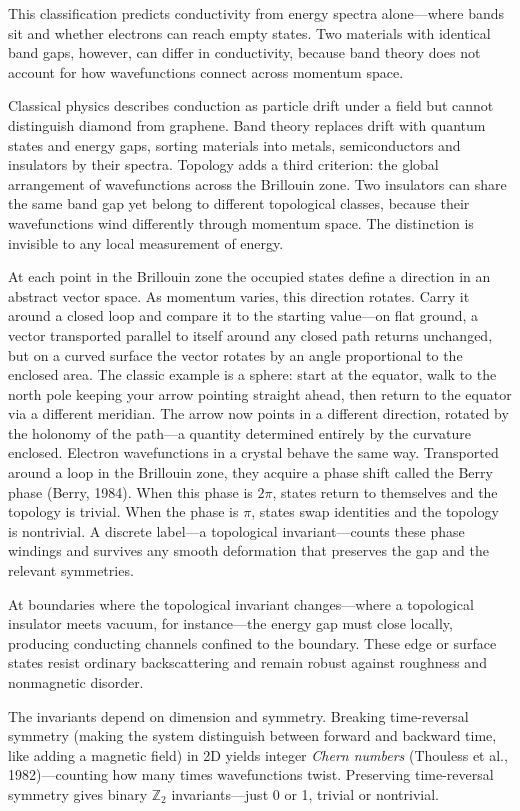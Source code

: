 This classification predicts conductivity from energy spectra alone—where bands sit and whether electrons can reach empty states. Two materials with identical band gaps, however, can differ in conductivity, because band theory does not account for how wavefunctions connect across momentum space.

Classical physics describes conduction as particle drift under a field but cannot distinguish diamond from graphene. Band theory replaces drift with quantum states and energy gaps, sorting materials into metals, semiconductors and insulators by their spectra. Topology adds a third criterion: the global arrangement of wavefunctions across the Brillouin zone. Two insulators can share the same band gap yet belong to different topological classes, because their wavefunctions wind differently through momentum space. The distinction is invisible to any local measurement of energy.

At each point in the Brillouin zone the occupied states define a direction in an abstract vector space. As momentum varies, this direction rotates. Carry it around a closed loop and compare it to the starting value—on flat ground, a vector transported parallel to itself around any closed path returns unchanged, but on a curved surface the vector rotates by an angle proportional to the enclosed area. The classic example is a sphere: start at the equator, walk to the north pole keeping your arrow pointing \QSOpen{}straight ahead,\QSClose{} then return to the equator via a different meridian. The arrow now points in a different direction, rotated by the holonomy of the path—a quantity determined entirely by the curvature enclosed. Electron wavefunctions in a crystal behave the same way. Transported around a loop in the Brillouin zone, they acquire a phase shift called the Berry phase (Berry, 1984). When this phase is $2\pi$, states return to themselves and the topology is trivial. When the phase is $\pi$, states swap identities and the topology is nontrivial. A discrete label—a topological invariant—counts these phase windings and survives any smooth deformation that preserves the gap and the relevant symmetries.

At boundaries where the topological invariant changes—where a topological insulator meets vacuum, for instance—the energy gap must close locally, producing conducting channels confined to the boundary. These edge or surface states resist ordinary backscattering and remain robust against roughness and nonmagnetic disorder.

The invariants depend on dimension and symmetry. Breaking time-reversal symmetry (making the system distinguish between forward and backward time, like adding a magnetic field) in 2D yields integer \emph{Chern numbers} (Thouless et al., 1982)—counting how many times wavefunctions twist. Preserving time-reversal symmetry gives binary \(\mathbb{Z}_2\) invariants—just 0 or 1, trivial or nontrivial.

